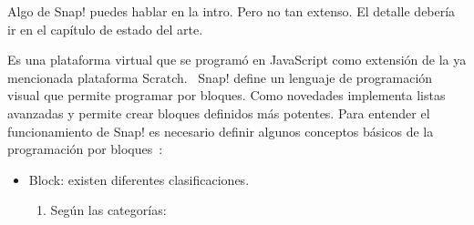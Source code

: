 \documentclass[a4paper, 12pt]{book}
\begin{document}
{\color{red} Algo de Snap! puedes hablar en la intro. Pero no tan extenso. El detalle debería ir en el capítulo de estado del arte.}

Es una plataforma virtual que se programó en JavaScript como extensión de la ya mencionada plataforma Scratch. ~Snap! define un lenguaje de programación visual que permite programar por bloques. Como novedades implementa listas avanzadas y permite crear bloques definidos  más potentes. Para entender el funcionamiento de Snap! es necesario definir algunos conceptos básicos de la programación por bloques~\cite{harvey2017snap}:
\begin{itemize}
    
    \item Block: existen diferentes clasificaciones. \begin{enumerate}[1)]
        \item Según las categorías:
   

\end{enumerate}
\end{itemize}
\end{document}
